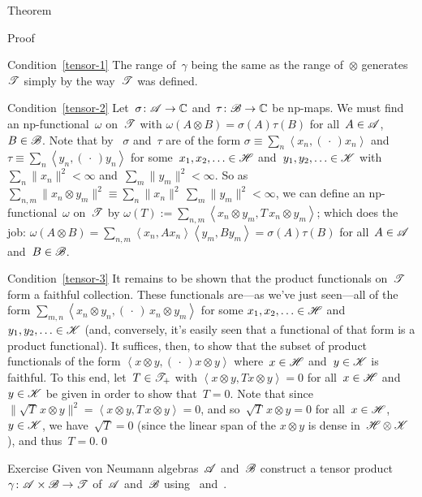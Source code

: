 \documentclass[a]{subfiles}
\begin{document}
\begin{parsec}
\begin{point}{Theorem}
\begin{point}{Proof}
\begin{point}{Condition~\ref{tensor-1}}
The range of~$\gamma$ being the same as the range of~$\otimes$
generates~$\mathscr{T}$ 
simply by the way~$\mathscr{T}$ was defined.
\end{point}
\begin{point}{Condition~\ref{tensor-2}}%
Let~$\sigma\colon \mathscr{A}\to\mathbb{C}$
and~$\tau\colon \mathscr{B}\to\mathbb{C}$ be np-maps.
We must find an np-functional~$\omega$ on~$\mathscr{T}$
with $\omega(A\otimes B)=\sigma(A)\tau(B)$
for all~$A\in \mathscr{A}$, $B\in \mathscr{B}$.
Note that by~
$\sigma$ and~$\tau$ are of the form
$\sigma\equiv\sum_n \left<x_n,(\,\cdot\,)x_n\right>$
and~$\tau\equiv\sum_n \left<y_n,(\,\cdot\,)y_n\right>$
for some~$x_1,x_2,\dotsc\in\mathscr{H}$
and~$y_1,y_2,\dotsc\in\mathscr{K}$
with~$\sum_n\|x_n\|^2<\infty$
and~$\sum_m\|y_m\|^2 <\infty$.
So as~$\sum_{n,m}\|x_n\otimes y_m\|^2\equiv\sum_n \|x_n\|^2\,
\sum_m\|y_m\|^2 <\infty$,
we can define
an np-functional~$\omega$ on~$\mathscr{T}$
by $\omega(T):= \sum_{n,m} \left<x_n\otimes y_m,
T\,x_n\otimes y_m\right>$;
which does the job:  $\omega(A\otimes B)
= \sum_{n,m} \left<x_n, Ax_n\right> \left<y_m,By_m\right>
= \sigma(A)\tau(B)$
for all~$A\in\mathscr{A}$ and~$B\in\mathscr{B}$.
\end{point}
\begin{point}{Condition~\ref{tensor-3}}%
It remains to be shown that the
product functionals
on~$\mathscr{T}$ form a faithful collection.
These functionals are---as we've just seen---all
of the form
$\sum_{m,n}\left<x_n\otimes y_n,(\,\cdot\,)\,x_n\otimes y_m\right>$
for some $x_1,x_2,\dotsc\in\mathscr{H}$
and~$y_1,y_2,\dotsc\in\mathscr{K}$
(and, conversely, it's easily seen
that a functional
of that form
is a product functional).
It suffices,
then,
to show that the subset of
product functionals
of the  form $\left<x\otimes y,(\,\cdot\,)x\otimes y\right>$
where~$x\in\mathscr{H}$ and~$y\in\mathscr{K}$ is faithful.
To this end,
let~$T\in\mathscr{T}_+$
with $\left< x\otimes y, Tx\otimes y\right>=0$
for all~$x\in\mathscr{H}$ and~$y\in\mathscr{K}$ be given
in order to show that~$T=0$.
Note that since
$\|\sqrt{T}\,x\otimes y\|^2=\left<x\otimes y,T\,x\otimes y\right>
=0$, and so~$\sqrt{T}\,x\otimes y=0$
for all~$x\in\mathscr{H}$, $y\in \mathscr{K}$,
we have~$\sqrt{T}=0$ (since the linear
span of the $x\otimes y$ is dense in~$\mathscr{H}\otimes\mathscr{K}$),
and thus~$T=0$.\qed
\end{point}
\end{point}
\end{point}
\begin{point}{Exercise}%
Given von Neumann algebras~$\mathscr{A}$ and~$\mathscr{B}$
construct a tensor product~$\gamma\colon \mathscr{A}\times \mathscr{B}\to\mathscr{T}$
of~$\mathscr{A}$ and~$\mathscr{B}$
using~ and~.
\end{point}
\end{parsec}
\end{document}
